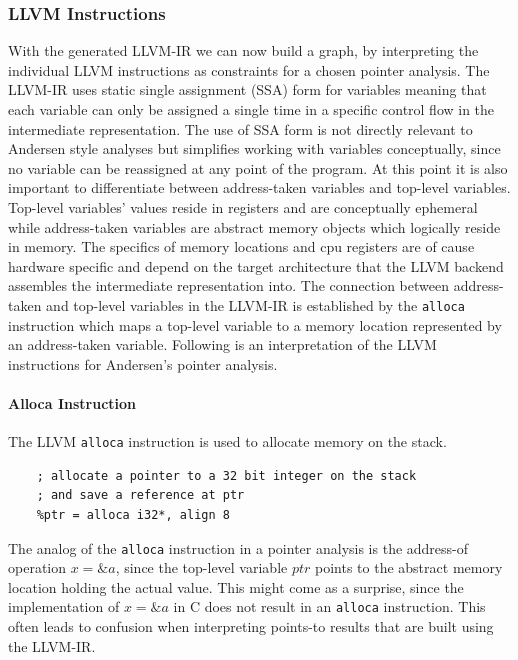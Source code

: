 \subsubsection{LLVM Instructions}
With the generated LLVM-IR we can now build a graph, by interpreting the individual LLVM instructions as constraints for a chosen pointer analysis.
The LLVM-IR uses static single assignment (SSA) form for variables meaning that each variable can only be assigned a single time in a specific control flow in the intermediate representation.
The use of SSA form is not directly relevant to Andersen style analyses but simplifies working with variables conceptually, since no variable can be reassigned at any point of the program.
At this point it is also important to differentiate between address-taken variables and top-level variables.
Top-level variables' values reside in registers and are conceptually ephemeral while address-taken variables are abstract memory objects which logically reside in memory. The specifics of memory locations and cpu registers are of cause hardware specific and depend on the target architecture that the LLVM backend assembles the intermediate representation into.
The connection between address-taken and top-level variables in the LLVM-IR is established by the \verb|alloca| instruction which maps a top-level variable to a memory location represented by an address-taken variable.
Following is an interpretation of the LLVM instructions for Andersen's pointer analysis.

\paragraph{Alloca Instruction}
The LLVM \verb|alloca| instruction is used to allocate memory on the stack.
\begin{verbatim}
    ; allocate a pointer to a 32 bit integer on the stack 
    ; and save a reference at ptr
    %ptr = alloca i32*, align 8
\end{verbatim}
The analog of the \verb|alloca| instruction in a pointer analysis is the address-of operation $x = \&a$, since the top-level variable $ptr$ points to the abstract memory location holding the actual value.
This might come as a surprise, since the implementation of $x = \&a$ in C does not result in an \verb|alloca| instruction. This often leads to confusion when interpreting points-to results that are built using the LLVM-IR.

